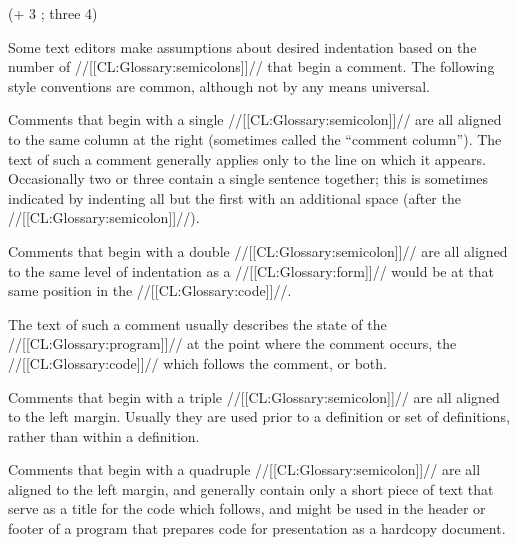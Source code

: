 
\code
 (+ 3 ; three
    4)      \endcode

\endsubsubsection%


Some text editors make assumptions about desired indentation based on the number of //[[CL:Glossary:semicolons]]// that begin a comment.  The following style  conventions are common, although not by any means universal.  


Comments that begin with a single //[[CL:Glossary:semicolon]]// are all aligned to  the same column at the right (sometimes called the ``comment column''). The text of such a comment generally applies only to the line on which it appears. Occasionally two or three contain a single sentence together; this is sometimes indicated by indenting all but the first with an additional space (after the //[[CL:Glossary:semicolon]]//).

\endsubsubsubsection%


Comments that begin with a double //[[CL:Glossary:semicolon]]// are all aligned to the same level of indentation as a //[[CL:Glossary:form]]// would be at that same position in the //[[CL:Glossary:code]]//.

The text of such a comment usually describes
    the state of the //[[CL:Glossary:program]]// at the point where the comment occurs,
    the //[[CL:Glossary:code]]// which follows the comment,
 or both.

\endsubsubsubsection%


Comments that begin with a triple //[[CL:Glossary:semicolon]]// are all aligned to the left margin.  Usually they are used prior to a definition or set of definitions, rather than within a definition.

\endsubsubsubsection%


Comments that begin with a quadruple //[[CL:Glossary:semicolon]]// are all aligned to the left margin, and generally contain only a short piece of text that serve as a title for the code which follows, and might be used in the header or footer of a program that prepares code for presentation as  a hardcopy document.

